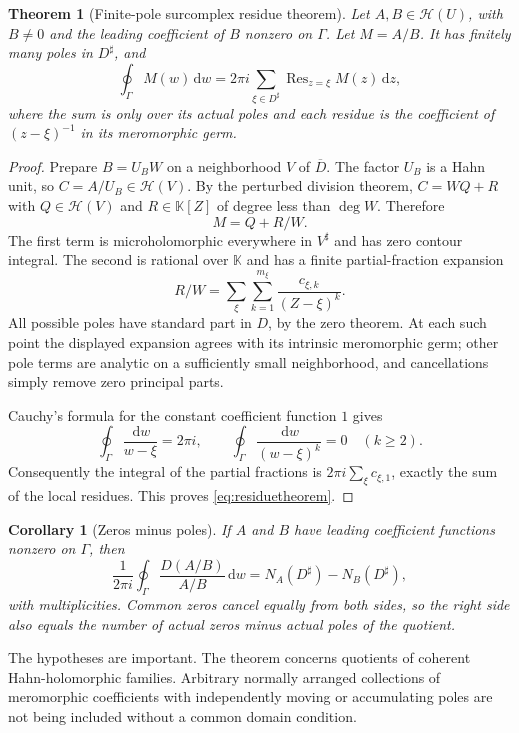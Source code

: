 \documentclass[11pt,letterpaper]{article}
\numberwithin{equation}{section}
\newtheorem{theorem}{Theorem}[section]
\newtheorem{corollary}[corollary]{Corollary}
\theoremstyle{definition}
\theoremstyle{remark}
\newcommand{\K}{\mathbb K}
\newcommand{\HH}{\mathscr H}
\newcommand{\dd}{\,\mathrm d}
\DeclareMathOperator{\Res}{Res}
\begin{document}
\begin{theorem}[Finite-pole surcomplex residue theorem]\label{thm:residue}
Let $A,B\in\HH(U)$, with $B\ne0$ and the leading coefficient of $B$
nonzero on $\Gamma$. Let $M=A/B$. It has finitely many poles in
$D^\sharp$, and
\begin{equation}\label{eq:residuetheorem}
 \oint_\Gamma M(w)\dd w
   =2\pi i\sum_{\xi\in D^\sharp}\Res_{z=\xi}M(z)\dd z,
\end{equation}
where the sum is only over its actual poles and each residue is the
coefficient of $(z-\xi)^{-1}$ in its meromorphic germ.
\end{theorem}
\begin{proof}
Prepare $B=U_BW$ on a neighborhood $V$ of $\overline D$. The factor
$U_B$ is a Hahn unit, so $C=A/U_B\in\HH(V)$. By the perturbed division
theorem, $C=WQ+R$ with $Q\in\HH(V)$ and $R\in\K[Z]$ of degree
less than $\deg W$. Therefore
\begin{equation}\label{eq:meromorphicdecomp}
 M=Q+R/W.
\end{equation}
The first term is microholomorphic everywhere in $V^\sharp$ and has
zero contour integral. The second is rational over $\K$ and has a finite
partial-fraction expansion
\[
 R/W=\sum_{\xi}\sum_{k=1}^{m_\xi}
                 \frac{c_{\xi,k}}{(Z-\xi)^k}.
\]
All possible poles have standard part in $D$, by the zero theorem.
At each such point the displayed expansion agrees with its intrinsic
meromorphic germ; other pole terms are analytic on a sufficiently small
neighborhood, and cancellations simply remove zero principal parts.

Cauchy's formula for the constant coefficient function $1$ gives
\[
 \oint_\Gamma\frac{\dd w}{w-\xi}=2\pi i,
 \qquad
 \oint_\Gamma\frac{\dd w}{(w-\xi)^k}=0\quad(k\ge2).
\]
Consequently the integral of the partial fractions is
$2\pi i\sum_\xi c_{\xi,1}$, exactly the sum of the local residues.
This proves \eqref{eq:residuetheorem}.
\end{proof}

\begin{corollary}[Zeros minus poles]
If $A$ and $B$ have leading coefficient functions nonzero on $\Gamma$,
then
\[
 \frac1{2\pi i}\oint_\Gamma\frac{D(A/B)}{A/B}\dd w
  =N_A(D^\sharp)-N_B(D^\sharp),
\]
with multiplicities. Common zeros cancel equally from both sides, so the
right side also equals the number of actual zeros minus actual poles
of the quotient.
\end{corollary}

The hypotheses are important. The theorem concerns quotients of coherent
Hahn-holomorphic families. Arbitrary normally arranged collections of
meromorphic coefficients with independently moving or accumulating poles
are not being included without a common domain condition.
\end{document}
